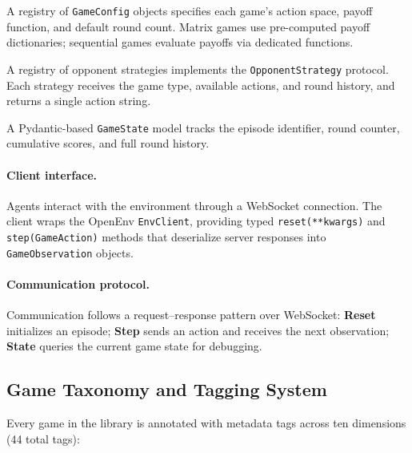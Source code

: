 \begin{description}[nosep]
    \item[Game Engine.] A registry of \texttt{GameConfig} objects
        specifies each game's action space, payoff function, and
        default round count. Matrix games use pre-computed payoff
        dictionaries; sequential games evaluate payoffs via dedicated
        functions.
    \item[Strategy Module.] A registry of opponent strategies
        implements the \texttt{OpponentStrategy} protocol. Each
        strategy receives the game type, available actions, and round
        history, and returns a single action string.
    \item[State Manager.] A Pydantic-based \texttt{GameState} model
        tracks the episode identifier, round counter, cumulative
        scores, and full round history.
\end{description}

\paragraph{Client interface.}
Agents interact with the environment through a WebSocket connection.
The client wraps the OpenEnv \texttt{EnvClient}, providing typed
\texttt{reset(**kwargs)} and \texttt{step(GameAction)} methods that
deserialize server responses into \texttt{GameObservation} objects.

\paragraph{Communication protocol.}
Communication follows a request--response pattern over WebSocket:
\textbf{Reset} initializes an episode; \textbf{Step} sends an action
and receives the next observation; \textbf{State} queries the current
game state for debugging.

\subsection{Game Taxonomy and Tagging System}
\label{sec:taxonomy}

Every game in the library is annotated with metadata tags across ten
dimensions (44 total tags):

